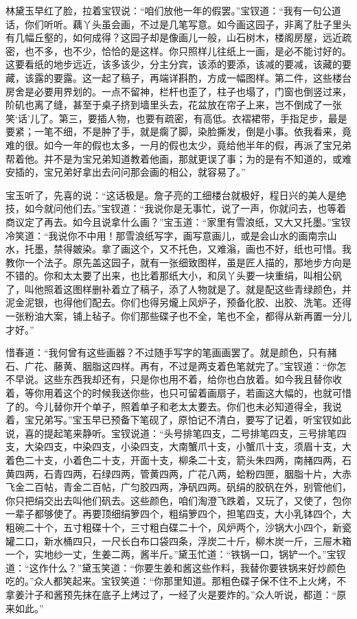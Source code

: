 \documentclass[12pt,oneside]{book}
\begin{document}
林黛玉早红了脸，拉着宝钗说：“咱们放他一年的假罢。”宝钗道：“我有一句公道话，你们听听。藕丫头虽会画，不过是几笔写意。如今画这园子，非离了肚子里头有几幅丘壑的，如何成得？这园子却是像画儿一般，山石树木，楼阁房屋，远近疏密，也不多，也不少，恰恰的是这样。你只照样儿往纸上一画，是必不能讨好的。这要看纸的地步远近，该多该少，分主分宾，该添的要添，该减的要减，该藏的要藏，该露的要露。这一起了稿子，再端详斟酌，方成一幅图样。第二件，这些楼台房舍是必要用界划的。一点不留神，栏杆也歪了，柱子也塌了，门窗也倒竖过来，阶矶也离了缝，甚至于桌子挤到墙里头去，花盆放在帘子上来，岂不倒成了一张笑‘话’儿了。第三，要插人物，也要有疏密，有高低。衣褶裙带，手指足步，最是要紧；一笔不细，不是肿了手，就是瘸了脚，染脸撕发，倒是小事。依我看来，竟难的很。如今一年的假也太多，一月的假也太少，竟给他半年的假，再派了宝兄弟帮着他。并不是为宝兄弟知道教着他画，那就更误了事；为的是有不知道的，或难安插的，宝兄弟好拿出去问问那会画的相公，就容易了。”

宝玉听了，先喜的说：“这话极是。詹子亮的工细楼台就极好，程日兴的美人是绝技，如今就问他们去。”宝钗道：“我说你是无事忙，说了一声，你就问去，也等着商议定了再去。如今且说拿什么画？”宝玉道：“家里有雪浪纸，又大又托墨。”宝钗冷笑道：“我说你不中用！那雪浪纸写字，画写意画儿，或是会山水的画南宗山水，托墨，禁得皴染。拿了画这个，又不托色，又难滃，画也不好，纸也可惜。我教你一个法子。原先盖这园子，就有一张细致图样，虽是匠人描的，那地步方向是不错的。你和太太要了出来，也比着那纸大小，和凤丫头要一块重绢，叫相公矾了，叫他照着这图样删补着立了稿子，添了人物就是了。就是配这些青绿颜色，并泥金泥银，也得他们配去。你们也得另爖上风炉子，预备化胶、出胶、洗笔。还得一张粉油大案，铺上毡子。你们那些碟子也不全，笔也不全，都得从新再置一分儿才好。”

惜春道：“我何曾有这些画器？不过随手写字的笔画画罢了。就是颜色，只有赭石、广花、藤黄、胭脂这四样。再有，不过是两支着色笔就完了。”宝钗道：“你怎不早说。这些东西我却还有，只是你也用不着，给你也白放着。如今我且替你收着，等你用着这个的时候我送你些，也只可留着画扇子，若画这大幅的，也就可惜了的。今儿替你开个单子，照着单子和老太太要去。你们也未必知道得全，我说着，宝兄弟写。”宝玉早已预备下笔砚了，原怕记不清白，要写了记着，听宝钗如此说，喜的提起笔来静听。宝钗说道：“头号排笔四支，二号排笔四支，三号排笔四支，大染四支，中染四支，小染四支，大南蟹爪十支，小蟹爪十支，须眉十支，大着色二十支，小着色二十支，开面十支，柳条二十支，箭头朱四两，南赭四两，石黄四两，石青四两，石绿四两，管黄四两，广花八两，蛤粉四匣，胭脂十片，大赤飞金二百帖，青金二百帖，广匀胶四两，净矾四两。矾绢的胶矾在外，别管他们，你只把绢交出去叫他们矾去。这些颜色，咱们淘澄飞跌着，又玩了，又使了，包你一辈子都够使了。再要顶细绢箩四个，粗绢箩四个，担笔四支，大小乳钵四个，大粗碗二十个，五寸粗碟十个，三寸粗白碟二十个，风炉两个，沙锅大小四个，新瓷罐二口，新水桶四只，一尺长白布口袋四条，浮炭二十斤，柳木炭一斤，三屉木箱一个，实地纱一丈，生姜二两，酱半斤。”黛玉忙道：“铁锅一口，锅铲一个。”宝钗道：“这作什么？”黛玉笑道：“你要生姜和酱这些作料，我替你要铁锅来好炒颜色吃的。”众人都笑起来。宝钗笑道：“你那里知道。那粗色碟子保不住不上火烤，不拿姜汁子和酱预先抹在底子上烤过了，一经了火是要炸的。”众人听说，都道：“原来如此。”
\end{document}
